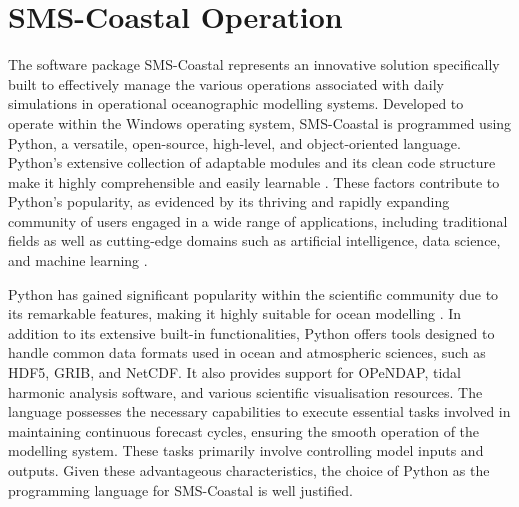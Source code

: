 \section{SMS-Coastal Operation} \label{sec:cp4_smsc}
The software package SMS-Coastal represents an innovative solution specifically built to effectively manage the various operations associated with daily simulations in operational oceanographic modelling systems. Developed to operate within the Windows operating system, SMS-Coastal is programmed using Python, a versatile, open-source, high-level, and object-oriented language. Python's extensive collection of adaptable modules and its clean code structure make it highly comprehensible and easily learnable \parencite{saenz2002geophysical}. These factors contribute to Python's popularity, as evidenced by its thriving and rapidly expanding community of users engaged in a wide range of applications, including traditional fields as well as cutting-edge domains such as artificial intelligence, data science, and machine learning \parencite{casanova2020applied}.

Python has gained significant popularity within the scientific community due to its remarkable features, making it highly suitable for ocean modelling \parencite{almeida2011oof}. In addition to its extensive built-in functionalities, Python offers tools designed to handle common data formats used in ocean and atmospheric sciences, such as HDF5, GRIB, and NetCDF. It also provides support for OPeNDAP, tidal harmonic analysis software, and various scientific visualisation resources. The language possesses the necessary capabilities to execute essential tasks involved in maintaining continuous forecast cycles, ensuring the smooth operation of the modelling system. These tasks primarily involve controlling model inputs and outputs. Given these advantageous characteristics, the choice of Python as the programming language for SMS-Coastal is well justified.

